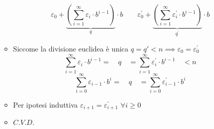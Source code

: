 \documentclass[10pt]{article}
\begin{document}
\begin{itemize}
\begin{itemize}
$$\displaystyle{\varepsilon_0 + \underbrace{\left(\sum_{i=1}^{\infty} \varepsilon_i \cdot b^{i-1} \right)}_{q} \cdot b \quad \quad \varepsilon^{'}_0 + \underbrace{\left(\sum_{i=1}^{\infty} \varepsilon^{'}_i \cdot b^{i-1} \right)}_{q^{'}} \cdot b}$$
\item
Siccome la divisione euclidea è unica $q = q' < n \implies \varepsilon_0 = \varepsilon^{'}_0$
$$ \displaystyle{\sum_{i = 1}^{\infty} \varepsilon_i \cdot b^{i -1} = \quad q \quad = \sum_{i = 1}^{\infty} \varepsilon^{'}_i \cdot b^{i -1}  \quad < n}$$
$$\!\!\!\!\!\!\!\!\!\!\!\!\!\!\!\!\sum_{i = 0}^{\infty} \varepsilon_{i-1} \cdot b^{i} = \quad q \quad = \sum_{i = 0}^{\infty} \varepsilon^{'}_{i-1} \cdot b^{i}$$
\item
Per ipotesi induttiva $\varepsilon_{i+1} = \varepsilon^{'}_{i+1} \,\,\forall i \geq 0$
\item
$C.V.D.$
\end{itemize}
\end{itemize}
\end{document}
